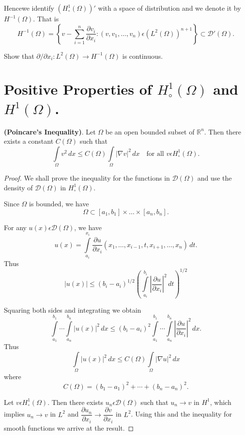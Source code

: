 Hence\pageoriginale we identify $(H_\circ^1(\Omega))'$ with a space of
distribution and we denote it by $H^{-1}(\Omega)$. That is 
$$
H^{-1}(\Omega)=\left\{v-\sum\limits_{i=1}^n\frac{\partial v_i}{\partial
x_i}: (v, v_1,\ldots,v_n) \epsilon (L^2(\Omega))^{n+1}\right\} \subset
\mathscr{D}' (\Omega).
$$

\begin{exer}\label{chap1:exer1}
Show that $\partial/\partial x_i:L^2(\Omega)\to H^{-1}(\Omega)$ is continuous.
\end{exer}

\section{Positive Properties of $H_\circ^1(\Omega)$ and
  $H^1(\Omega)$.}\label{chap1:subsec1.7}

\begin{THM}\label{chap1:THM3}
{\bf (Poincare's Inequality)}. Let $\Omega$ be an open bounded subset
of $\mathbb{R}^n$. Then there exists a constant $C(\Omega)$ such that 
$$
\int\limits_\Omega v^2\,dx \leq C(\Omega)\int\limits_\Omega|\nabla v|^2
\,dx \quad \text{for all } v \epsilon H_\circ^1(\Omega).
$$
\end{THM}

\begin{proof}
We shall prove the inequality for the functions in $\mathscr{D}
(\Omega)$ and use the density of $\mathscr{D} (\Omega)$ in
$H_\circ^1(\Omega)$.

Since $\Omega$ is bounded, we have 
$$
\Omega \subset[a_1, b_1] \times\ldots\times[a_n, b_n].
$$

For any $u(x) \epsilon \mathscr{D}(\Omega)$, we have 
$$
u(x)=\int\limits_{a_i}^{x_i}\frac{\partial u}{\partial
x_i}(x_1,\ldots, x_{i-1},t, x_{i+1},\ldots,x_n)\,dt.
$$
Thus 
$$
|u(x)|\leq (b_i-a_i)^{1/2} \left(\int\limits_{a_i}^{b_i}\left|\frac{\partial u}
{\partial x_i}\right|^2\,dt\right)^{1/2}
$$

Squaring both sides and integrating we obtain
$$
\int\limits_{a_1}^{b_1}\cdots \int\limits_{a_n}^{b_n} |u(x)|^2\,dx\leq
(b_i-a_i)^2 \int\limits_{a_1}^{b_1}\cdots \int\limits_{a_n}^{b_n}
\left|\frac{\partial u}{\partial x_i}\right|^2 \,dx.
$$
Thus\pageoriginale
$$
\int\limits_\Omega |u(x)|^2 \,dx \leq C(\Omega)\int\limits_\Omega
|\nabla u|^2 \,dx
$$
where
$$
C(\Omega)=(b_1-a_1)^2+\cdots +(b_n-a_n)^2.
$$

Let $v\epsilon H_\circ^1(\Omega)$. Then there exists $u_n
\epsilon \mathscr{D}(\Omega)$ such that $u_n\to v$ in $H^1$, which
implies $u_n\to v$ in $L^2$ and $\dfrac{\partial u_n}{\partial x_i} \to
\dfrac{\partial v}{\partial x_i}$ in $L^2$. Using this and the
inequality for smooth functions we arrive at the result.
\end{proof}

